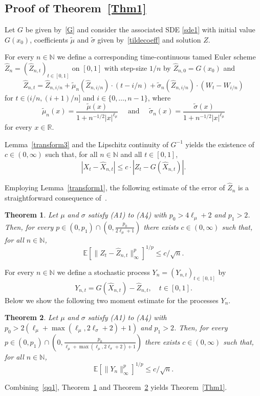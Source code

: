 \documentclass[11pt]{amsart}
\newcommand{\R}{{\mathbb R}}
\newcommand{\N}{{\mathbb N}}
\newcommand{\EE}{{\mathbb E}}
\newcommand{\eultr}{{\widehat Z}}
\theoremstyle{plain}
\newtheorem{theorem}{Theorem}
\theoremstyle{definition}
\begin{document}
\subsection{Proof of Theorem~\ref{Thm1}}\label{proof1}
Let $G$ be given by~\eqref{G} and consider the associated SDE \eqref{sde1} with initial value $G(x_0)$, coefficients $\widetilde\mu$ and $\widetilde\sigma$ given by~\eqref{tildecoeff} and solution $Z$.

For every $n\in\N$ we define a corresponding time-continuous tamed Euler scheme $\eultr_{n}=(\eultr_{n,t})_{t\in[0,1]}$  on $[0,1]$ with step-size $1/n$ by $\eultr_{n,0}=G(x_0)$ and
\begin{equation}\label{eultr}
\eultr_{n,t}=\eultr_{n,i/n}+ \widetilde\mu_n(\eultr_{n,i/n})\cdot (t-i/n)+ \widetilde\sigma_n(\eultr_{n,i/n})\cdot (W_t-W_{i/n})
\end{equation}
for $t\in(i/n,(i+1)/n]$ and $i\in\{0,\ldots,n-1\}$, where
\[
\widetilde\mu_n(x) = \frac{\widetilde\mu(x)}{1+n^{-1/2}|x|^{\ell_\mu}}\quad \text{ and }\quad \widetilde\sigma_n(x) = \frac{\widetilde\sigma(x)}{1+n^{-1/2}|x|^{\ell_\mu}}
\]
for every $x\in\R$.


 Lemma~\ref{transform3} and the Lipschitz continuity of $G^{-1}$ yields the existence of $c\in(0,\infty)$ such that, for all $n\in\N$ and all $t\in[0,1]$,
\begin{equation}\label{qq1}
	|X_t-\widehat X_{n,t}| \le c\cdot 	|Z_t- G(\widehat X_{n,t})|.
\end{equation}


Employing Lemma~\ref{transform1}, the following estimate of the error of $\widehat Z_n$  is a straightforward consequence of~\cite[Theorem 3]{Sabanis2016}.

\begin{theorem}\label{sotirios-aap}\mbox{}
 Let $\mu$ and $\sigma$ satisfy (A1) to (A4) with  $p_0 > 4\ell_\mu+2$ and $p_1>2$.
	Then, for every $p\in (0,p_1)\cap (0,\frac{p_0}{2\ell_\mu +1})$ there exists $c\in (0,\infty)$ such that, for all $n\in\N$,
	\[
		\EE[\|Z_t-\widehat Z_{n,t}\|_\infty^p]^{1/p}	\le  c/\sqrt{n}.	
	\]
	
\end{theorem}

For every $n\in\N$ we define a stochastic process $Y_n =(Y_{n,t})_{t\in[0,1]}$ by
\[
Y_{n,t} = G(\widehat X_{n,t}) - \widehat Z_{n,t},\quad t\in[0,1].
\]
Below we show the following two moment estimate for the processes $Y_n$.
\begin{theorem}\label{comp}\mbox{}
 Let $\mu$ and $\sigma$ satisfy (A1) to (A4) with $p_0 > 2(\ell_\mu +  \max(\ell_\mu, 2\ell_\sigma +2)+ 1)$ and $p_1>2$.
		Then, for every $p\in (0,p_1)\cap (0,\frac{p_0}{\ell_\mu +  \max(\ell_\mu, 2\ell_\sigma +2)+ 1})$
		there exists $c\in (0,\infty)$ such that, for all $n\in\N$,
		\[
			\EE[\|Y_{n}\|_\infty^p]^{1/p}	\le  c/\sqrt{n}.	
		\]
\end{theorem}
Combining~\eqref{qq1},
Theorem~\ref{sotirios-aap} and Theorem~\ref{comp} yields Theorem~\ref{Thm1}.
\end{document}
